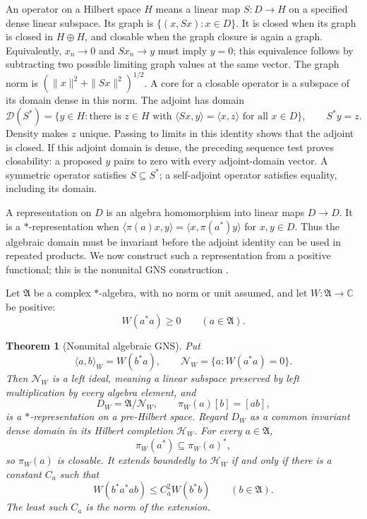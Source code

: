 \documentclass[11pt]{article}
\newtheorem{theorem}{Theorem}[section]
\theoremstyle{definition}
\theoremstyle{remark}
\numberwithin{equation}{section}
\newcommand{\cN}{\mathcal N}
\newcommand{\C}{\mathbb C}
\begin{document}
An operator on a Hilbert space $H$ means a linear map $S:D\to H$ on a
specified dense linear subspace.  Its graph is $\{(x,Sx):x\in D\}$.
It is closed when its graph is closed in $H\oplus H$, and closable when
the graph closure is again a graph.  Equivalently, $x_n\to0$ and
$Sx_n\to y$ must imply $y=0$; this equivalence follows by subtracting two
possible limiting graph values at the same vector.
The graph norm is $(\|x\|^2+\|Sx\|^2)^{1/2}$.  A core for a closable
operator is a subspace of its domain dense in this norm.
The adjoint has domain
\[
 \mathcal D(S^*)=\{y\in H:\text{there is }z\in H\text{ with }
           \langle Sx,y\rangle=\langle x,z\rangle\text{ for all }x\in D\},
 \qquad S^*y=z.
\]
Density makes $z$ unique.  Passing to limits in this identity shows that
the adjoint is closed.  If this adjoint domain is dense, the preceding
sequence test proves closability: a proposed $y$ pairs to zero with every
adjoint-domain vector.  A symmetric operator satisfies $S\subseteq S^*$;
a self-adjoint operator satisfies equality, including its domain.

A representation on $D$ is an algebra homomorphism into linear maps
$D\to D$.  It is a $*$-representation when
$\langle\pi(a)x,y\rangle=\langle x,\pi(a^*)y\rangle$ for $x,y\in D$.
Thus the algebraic domain must be invariant before the adjoint identity
can be used in repeated products.  We now construct such a representation
from a positive functional; this is the nonunital GNS construction
\cite{Segal1947}.

Let $\mathfrak A$ be a complex $*$-algebra, with no norm or unit assumed,
and let $W:\mathfrak A\to\C$ be positive:
\[
 W(a^*a)\geq0\qquad(a\in\mathfrak A).
\]

\begin{theorem}[Nonunital algebraic GNS]
\label{thm:gns}
Put
\[
 \langle a,b\rangle_W=W(b^*a),
 \qquad
 \cN_W=\{a:W(a^*a)=0\}.
\]
Then $\cN_W$ is a left ideal, meaning a linear subspace preserved by
left multiplication by every algebra element, and
\begin{equation}
 D_W=\mathfrak A/\cN_W,
 \qquad
 \pi_W(a)[b]=[ab],
 \label{eq:gns-action}
\end{equation}
is a $*$-representation on a pre-Hilbert space.  Regard $D_W$ as a
common invariant dense domain in its Hilbert completion $\mathcal H_W$.
For every $a\in\mathfrak A$,
\begin{equation}
 \pi_W(a^*)\subseteq\pi_W(a)^*,
 \label{eq:adjoint-inclusion}
\end{equation}
so $\pi_W(a)$ is closable.  It extends boundedly to $\mathcal H_W$ if
and only if there is a constant $C_a$ such that
\begin{equation}
 W(b^*a^*ab)\leq C_a^2W(b^*b)
 \qquad(b\in\mathfrak A).
 \label{eq:multiplier-bound}
\end{equation}
The least such $C_a$ is the norm of the extension.
\end{theorem}
\end{document}
